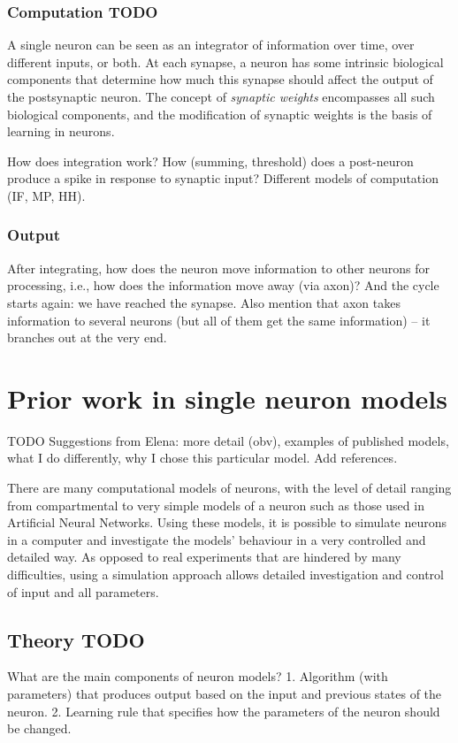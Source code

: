 \documentclass[a4paper,12pt]{report}
\theoremstyle{definition}
\begin{document}
\subsubsection{Computation TODO}
A single neuron can be seen as an integrator of information over time, over different inputs, or both. At each synapse, a neuron has some intrinsic biological components that determine how much this synapse should affect the output of the postsynaptic neuron. The concept of \emph{synaptic weights} encompasses all such biological components, and the modification of synaptic weights is the basis of learning in neurons.

How does integration work? How (summing, threshold) does a post-neuron produce a spike in response to synaptic input? Different models of computation (IF, MP, HH).

\subsubsection{Output}
After integrating, how does the neuron move information to other neurons for processing, i.e., how does the information move away (via axon)? And the cycle starts again: we have reached the synapse. Also mention that axon takes information to several neurons (but all of them get the same information) -- it branches out at the very end.



\section{Prior work in single neuron models}
TODO Suggestions from Elena: more detail (obv), examples of published models, what I do differently, why I chose this particular model. Add references.


There are many computational models of neurons, with the level of detail ranging from compartmental to very simple models of a neuron such as those used in Artificial Neural Networks. Using these models, it is possible to simulate neurons in a computer and investigate the models' behaviour in a very controlled and detailed way. As opposed to real experiments that are hindered by many difficulties, using a simulation approach allows detailed investigation and control of input and all parameters.

\subsection{Theory TODO}
What are the main components of neuron models? 1. Algorithm (with parameters) that produces output based on the input and previous states of the neuron. 2. Learning rule that specifies how the parameters of the neuron should be changed.
\end{document}
